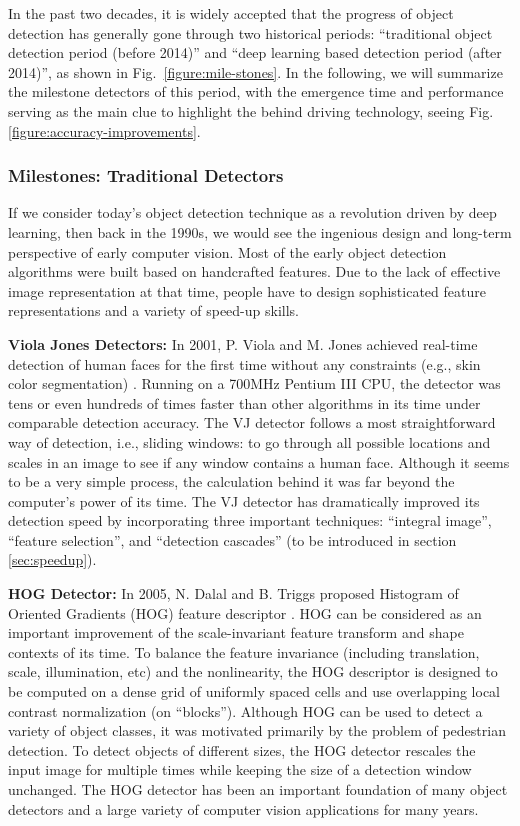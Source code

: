 \documentclass[lettersize,journal]{IEEEtran}
\begin{document}
In the past two decades, it is widely accepted that the progress of object detection has generally gone through two historical periods: ``traditional object detection period (before 2014)'' and ``deep learning based detection period (after 2014)'', as shown in Fig.\ \ref{figure:mile-stones}. In the following, we will summarize the milestone detectors of this period, with the emergence time and performance serving as the main clue to highlight the behind driving technology, seeing Fig. \ref{figure:accuracy-improvements}. 

\subsubsection{Milestones: Traditional Detectors}

If we consider today’s object detection technique as a revolution driven by deep learning, then back in the 1990s, we would see the ingenious design and long-term perspective of early computer vision. Most of the early object detection algorithms were built based on handcrafted features. Due to the lack of effective image representation at that time, people have to design sophisticated feature representations and a variety of speed-up skills.

\textbf{Viola Jones Detectors:}
In 2001, P. Viola and M. Jones achieved real-time detection of human faces for the first time without any constraints (e.g., skin color segmentation) \cite{CVPR01-VJ, IJCV04-VJ}. Running on a 700MHz Pentium III CPU, the detector was tens or even hundreds of times faster than other algorithms in its time under comparable detection accuracy. 
The VJ detector follows a most straightforward way of detection, i.e., sliding windows: to go through all possible locations and scales in an image to see if any window contains a human face. Although it seems to be a very simple process, the calculation behind it was far beyond the computer's power of its time. The VJ detector has dramatically improved its detection speed by incorporating three important techniques: ``integral image'', ``feature selection'', and ``detection cascades'' (to be introduced in section \ref{sec:speedup}). 


\textbf{HOG Detector:}
In 2005, N. Dalal and B. Triggs proposed Histogram of Oriented Gradients (HOG) feature descriptor \cite{CVPR05-HOG}. HOG can be considered as an important improvement of the scale-invariant feature transform \cite{ICCV99-SIFT,IJCV04-SIFT} and shape contexts \cite{TPAMI02-ShapeContexts} of its time. To balance the feature invariance (including translation, scale, illumination, etc) and the nonlinearity, the HOG descriptor is designed to be computed on a dense grid of uniformly spaced cells and use overlapping local contrast normalization (on ``blocks''). Although HOG can be used to detect a variety of object classes, it was motivated primarily by the problem of pedestrian detection. To detect objects of different sizes, the HOG detector rescales the input image for multiple times while keeping the size of a detection window unchanged. The HOG detector has been an important foundation of many object detectors \cite{CVPR08-DPM,CVPR10-DPM,ICCV11-Exemplar} and a large variety of computer vision applications for many years.
\end{document}
